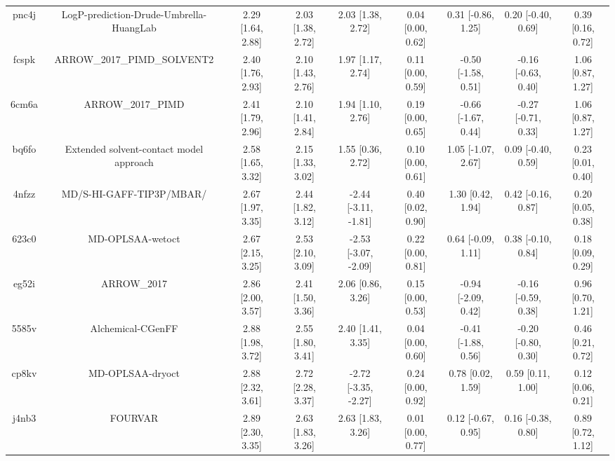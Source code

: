 \documentclass{article}
\begin{document}
\begin{center}
\begin{longtable}{|ccccccccc|}
 pnc4j &            LogP-prediction-Drude-Umbrella-HuangLab &  2.29 [1.64, 2.88] &  2.03 [1.38, 2.72] &     2.03 [1.38, 2.72] &  0.04 [0.00, 0.62] &   0.31 [-0.86, 1.25] &   0.20 [-0.40, 0.69] &     0.39 [0.16, 0.72] \\
 fcspk &                        ARROW\_2017\_PIMD\_SOLVENT2 &  2.40 [1.76, 2.93] &  2.10 [1.43, 2.76] &     1.97 [1.17, 2.74] &  0.11 [0.00, 0.59] &  -0.50 [-1.58, 0.51] &  -0.16 [-0.63, 0.40] &     1.06 [0.87, 1.27] \\
 6cm6a &                                  ARROW\_2017\_PIMD &  2.41 [1.79, 2.96] &  2.10 [1.41, 2.84] &     1.94 [1.10, 2.76] &  0.19 [0.00, 0.65] &  -0.66 [-1.67, 0.44] &  -0.27 [-0.71, 0.33] &     1.06 [0.87, 1.27] \\
 bq6fo &            Extended solvent-contact model approach &  2.58 [1.65, 3.32] &  2.15 [1.33, 3.02] &     1.55 [0.36, 2.72] &  0.10 [0.00, 0.61] &   1.05 [-1.07, 2.67] &   0.09 [-0.40, 0.59] &     0.23 [0.01, 0.40] \\
 4nfzz &                           MD/S-HI-GAFF-TIP3P/MBAR/ &  2.67 [1.97, 3.35] &  2.44 [1.82, 3.12] &  -2.44 [-3.11, -1.81] &  0.40 [0.02, 0.90] &    1.30 [0.42, 1.94] &   0.42 [-0.16, 0.87] &     0.20 [0.05, 0.38] \\
 623c0 &                                   MD-OPLSAA-wetoct &  2.67 [2.15, 3.25] &  2.53 [2.10, 3.09] &  -2.53 [-3.07, -2.09] &  0.22 [0.00, 0.81] &   0.64 [-0.09, 1.11] &   0.38 [-0.10, 0.84] &     0.18 [0.09, 0.29] \\
 eg52i &                                        ARROW\_2017 &  2.86 [2.00, 3.57] &  2.41 [1.50, 3.36] &     2.06 [0.86, 3.26] &  0.15 [0.00, 0.53] &  -0.94 [-2.09, 0.42] &  -0.16 [-0.59, 0.38] &     0.96 [0.70, 1.21] \\
 5585v &                                  Alchemical-CGenFF &  2.88 [1.98, 3.72] &  2.55 [1.80, 3.41] &     2.40 [1.41, 3.35] &  0.04 [0.00, 0.60] &  -0.41 [-1.88, 0.56] &  -0.20 [-0.80, 0.30] &     0.46 [0.21, 0.72] \\
 cp8kv &                                   MD-OPLSAA-dryoct &  2.88 [2.32, 3.61] &  2.72 [2.28, 3.37] &  -2.72 [-3.35, -2.27] &  0.24 [0.00, 0.92] &    0.78 [0.02, 1.59] &    0.59 [0.11, 1.00] &     0.12 [0.06, 0.21] \\
 j4nb3 &                                            FOURVAR &  2.89 [2.30, 3.35] &  2.63 [1.83, 3.26] &     2.63 [1.83, 3.26] &  0.01 [0.00, 0.77] &   0.12 [-0.67, 0.95] &   0.16 [-0.38, 0.80] &     0.89 [0.72, 1.12] \\

\end{longtable}
\end{center}
\end{document}
